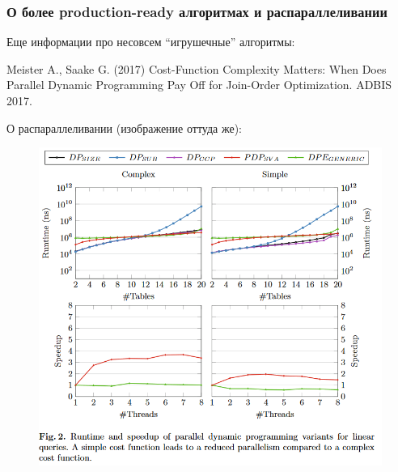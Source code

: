 \documentclass{beamer}
\begin{document}
\begin{frame}
	\frametitle{О более production-ready алгоритмах и распараллеливании}

Еще информации про несовсем ``игрушечные'' алгоритмы:

\scriptsize

Meister A., Saake G. (2017) Cost-Function Complexity Matters: When Does Parallel Dynamic Programming Pay Off for Join-Order Optimization. ADBIS 2017.

\normalsize

О распараллеливании (изображение оттуда же):

\begin{figure}[htb]
	\includegraphics[width=\textwidth,height=0.630\textheight,keepaspectratio]{parallel-dp-enumeration.png}
\end{figure}

\end{frame}
\end{document}
